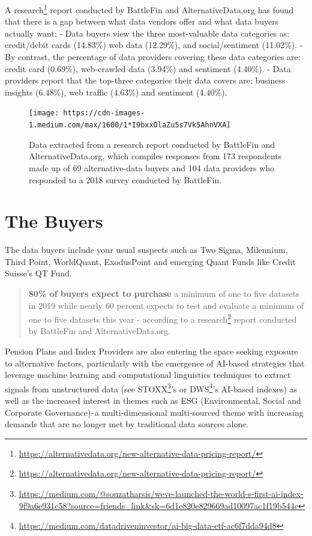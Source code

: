 \documentclass[]{book}
\DeclareRobustCommand{\href}[2]{#2\footnote{\url{#1}}}
\theoremstyle{definition}
\theoremstyle{definition}
\theoremstyle{definition}
\theoremstyle{remark}
\begin{document}
A
\href{https://alternativedata.org/new-alternative-data-pricing-report/}{research}
report conducted by BattleFin and AlternativeData.org has found that
there is a gap between what data vendors offer and what data buyers
actually want: - Data buyers view the three most-valuable data
categories as: credit/debit cards (14.83\%) web data (12.29\%), and
social/sentiment (11.02\%). - By contrast, the percentage of data
providers covering these data categories are: credit card (0.69\%),
web-crawled data (3.94\%) and sentiment (4.40\%). - Data providers
report that the top-three categories their data covers are: business
insights (6.48\%), web traffic (4.63\%) and sentiment (4.40\%).

\begin{figure}[h]

{\centering \texttt{[image: https://cdn-images-1.medium.com/max/1600/1*I9bxxOlaZu5s7Vk5AhnVXA]} 

}

\caption{Data extracted from a research report conducted by BattleFin and AlternativeData.org, which compiles responses from 173 respondents made up of 69 alternative-data buyers and 104 data providers who responded to a 2018 survey conducted by BattleFin.}\label{fig:unnamed-chunk-62}
\end{figure}

\section{The Buyers}\label{the-buyers}

The data buyers include your usual suspects such as Two Sigma,
Milennium, Third Point, WorldQuant, ExodusPoint and emerging Quant Funds
like Credit Suisse's QT Fund.

\begin{quote}
\textbf{80\% of buyers expect to purchase} a minimum of one to five
datasets in 2019 while nearly 60 percent expects to test and evaluate a
minimum of one to five datasets this year - according to a
\href{https://alternativedata.org/new-alternative-data-pricing-report/}{research}
report conducted by BattleFin and AlternativeData.org.
\end{quote}

Pension Plans and Index Providers are also entering the space seeking
exposure to alternative factors, particularly with the emergence of
AI-based strategies that leverage machine learning and computational
linguistics techniques to extract signals from unstructured data (see
\href{https://medium.com/@souzatharsis/weve-launched-the-world-s-first-ai-index-9f9a6e931c58?source=friends_link\&sk=6d1e820e829669ad10097ac1f19b544c}{STOXX}'s
or
\href{https://medium.com/datadriveninvestor/ai-big-data-etf-ac6f7dda94d8}{DWS}'s
AI-based indexes) as well as the increased interest in themes such as
ESG (Environmental, Social and Corporate Governance) - a
multi-dimensional multi-sourced theme with increasing demands that are
no longer met by traditional data sources alone.
\end{document}
